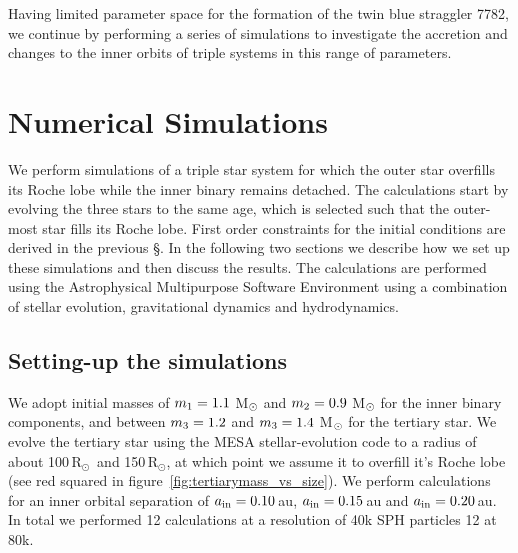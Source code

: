 \documentclass{aastex62}
\newcommand{\RSun}{\mbox{R$_\odot$}}
\begin{document}
Having limited parameter space for the formation of the twin blue
straggler 7782, we continue by performing a series of simulations to
investigate the accretion and changes to the inner orbits of triple
systems in this range of parameters.

\section{Numerical Simulations} \label{sims}

We perform simulations of a triple star system for which the outer
star overfills its Roche lobe while the inner binary remains
detached. The calculations start by evolving the three stars to the
same age, which is selected such that the outer-most star fills its
Roche lobe.  First order constraints for the initial conditions are
derived in the previous \S. In the following two sections we describe
how we set up these simulations and then discuss the results. The
calculations are performed using the Astrophysical Multipurpose
Software Environment using a combination of stellar evolution,
gravitational dynamics and hydrodynamics.

\subsection{Setting-up the simulations}

We adopt initial masses of $m_{\rm 1} = 1.1$ M$_{\rm \odot}$ and
$m_{\rm 2} = 0.9$ M$_{\rm \odot}$ for the inner binary components, and
between $m_{\rm 3} = 1.2$ and $m_{\rm 3} = 1.4$ M$_{\rm \odot}$ for
the tertiary star.  We evolve the tertiary star using the MESA
stellar-evolution code \cite{2011ApJS..192....3P} to a radius of about
100\,\RSun\, and 150\,\RSun, at which point we assume it to overfill
it's Roche lobe (see red squared in
figure~\ref{fig:tertiarymass_vs_size}).  We perform calculations for an
inner orbital separation of $a_{\rm in} = 0.10$\,au, $a_{\rm in} =
0.15$\,au and $a_{\rm in} = 0.20$\,au.  In total we performed 12
calculations at a resolution of 40k SPH particles 12 at 80k.
\end{document}
